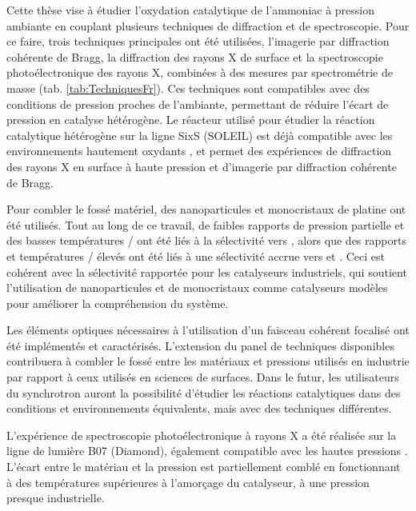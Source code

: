 Cette thèse vise à étudier l'oxydation catalytique de l'ammoniac à pression ambiante en couplant plusieurs techniques de diffraction et de spectroscopie.
Pour ce faire, trois techniques principales ont été utilisées, l'imagerie par diffraction cohérente de Bragg, la diffraction des rayons X de surface et la spectroscopie photoélectronique des rayons X, combinées à des mesures par spectrométrie de masse (tab. \ref{tab:TechniquesFr}).
Ces techniques sont compatibles avec des conditions de pression proches de l'ambiante, permettant de réduire l'écart de pression en catalyse hétérogène.
Le réacteur utilisé pour étudier la réaction catalytique hétérogène sur la ligne SixS (SOLEIL) est déjà compatible avec les environnements hautement oxydants \parencite{VanRijn2010, Resta2020a}, et permet des expériences de diffraction des rayons X en surface à haute pression et d'imagerie par diffraction cohérente de Bragg.

Pour combler le fossé matériel, des nanoparticules et monocristaux de platine ont été utilisés.
Tout au long de ce travail, de faibles rapports de pression partielle et des basses températures / ont été liés à la sélectivité vers , alors que des rapports et températures / élevés ont été liés à une sélectivité accrue vers  et .
Ceci est cohérent avec la sélectivité rapportée pour les catalyseurs industriels, qui soutient l'utilisation de nanoparticules et de monocristaux comme catalyseurs modèles pour améliorer la compréhension du système.

Les éléments optiques nécessaires à l'utilisation d'un faisceau cohérent focalisé ont été implémentés et caractérisés.
L'extension du panel de techniques disponibles contribuera à combler le fossé entre les matériaux et pressions utilisés en industrie par rapport à ceux utilisés en sciences de surfaces.
Dans le futur, les utilisateurs du synchrotron auront la possibilité d'étudier les réactions catalytiques dans des conditions et environnements équivalents, mais avec des techniques différentes.

L'expérience de spectroscopie photoélectronique à rayons X a été réalisée sur la ligne de lumière B07 (Diamond), également compatible avec les hautes pressions \parencite{Held2020}.
L'écart entre le matériau et la pression est partiellement comblé en fonctionnant à des températures supérieures à l'amorçage du catalyseur, à une pression presque industrielle.

